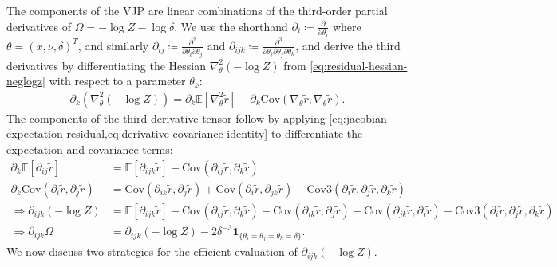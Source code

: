 \documentclass{article}
\begin{document}
The components of the VJP are linear combinations of the third-order partial derivatives of $\Omega = -\log Z - \log\delta$.
We use the shorthand $\partial_i \coloneqq \frac{\partial}{\partial \theta_i}$ where $\theta = (x, \nu, \delta)^T$, and similarly $\partial_{ij} \coloneqq \frac{\partial^2}{\partial \theta_i \partial \theta_j}$ and $\partial_{ijk} \coloneqq \frac{\partial^3}{\partial \theta_i \partial \theta_j \partial \theta_k}$, and derive the third derivatives by differentiating the Hessian $\nabla_{\theta}^2 (-\log Z)$ from \cref{eq:residual-hessian-neglogz} with respect to a parameter $\theta_k$:
%
\begin{align}
  \partial_{k}(\nabla_{\theta}^2 (-\log Z)) = \partial_{k} \mathbb{E}[\nabla_\theta^2 \tilde{r}] - \partial_{k}\mathrm{Cov}(\nabla_\theta \tilde{r}, \nabla_\theta \tilde{r}).
\end{align}
%
The components of the third-derivative tensor follow by applying \cref{eq:jacobian-expectation-residual,eq:derivative-covariance-identity} to differentiate the expectation and covariance terms:
%
\begin{align}
  \partial_{k} \mathbb{E}[\partial_{ij} \tilde{r}]                         & = \mathbb{E}[\partial_{ijk} \tilde{r}] - \mathrm{Cov}(\partial_{ij} \tilde{r}, \partial_{k} \tilde{r})                                                                                                                                                                                                                                                             \\
  \partial_{k}\mathrm{Cov}(\partial_{i} \tilde{r}, \partial_{j} \tilde{r}) & = \mathrm{Cov}(\partial_{ik} \tilde{r}, \partial_{j} \tilde{r}) + \mathrm{Cov}(\partial_{i} \tilde{r}, \partial_{jk} \tilde{r}) - \mathrm{Cov3}(\partial_{i} \tilde{r}, \partial_{j} \tilde{r}, \partial_{k} \tilde{r})                                                                                                                                            \\
  \Rightarrow \partial_{ijk} (-\log Z)                                     & = \mathbb{E}[\partial_{ijk} \tilde{r}] - \mathrm{Cov}(\partial_{ij} \tilde{r}, \partial_{k} \tilde{r}) - \mathrm{Cov}(\partial_{ik} \tilde{r}, \partial_{j} \tilde{r}) - \mathrm{Cov}(\partial_{jk} \tilde{r}, \partial_{i} \tilde{r}) + \mathrm{Cov3}(\partial_{i} \tilde{r}, \partial_{j} \tilde{r}, \partial_{k} \tilde{r}) \label{eq:neglogz-third-derivative} \\
  \Rightarrow \partial_{ijk} \Omega                                        & = \partial_{ijk} (-\log Z) - 2\delta^{-3} \mathbf{1}_{\{\theta_i=\theta_j=\theta_k=\delta\}}. \label{eq:omega-third-derivative-qrician}
\end{align}
%
We now discuss two strategies for the efficient evaluation of $\partial_{ijk}(-\log Z)$.
\end{document}
